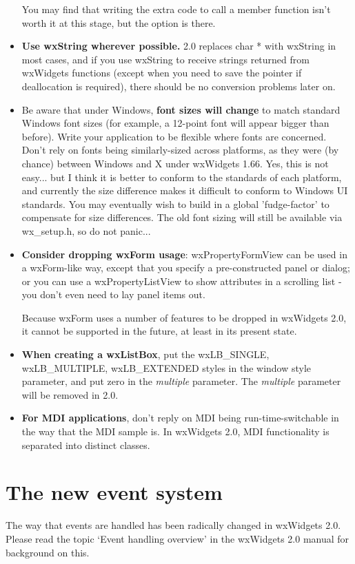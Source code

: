 \begin{itemize}
You may find that writing the extra code to call a member function isn't worth it at this stage,
but the option is there.
\item {\bf Use wxString wherever possible.} 2.0 replaces char * with wxString
in most cases, and if you use wxString to receive strings returned from
wxWidgets functions (except when you need to save the pointer if deallocation is required), there should
be no conversion problems later on.
\item Be aware that under Windows, {\bf font sizes will change} to match standard Windows
font sizes (for example, a 12-point font will appear bigger than before). Write your application
to be flexible where fonts are concerned.
Don't rely on fonts being similarly-sized across platforms, as they were (by chance) between
Windows and X under wxWidgets 1.66. Yes, this is not easy... but I think it is better to conform to the
standards of each platform, and currently the size difference makes it difficult to
conform to Windows UI standards. You may eventually wish to build in a global 'fudge-factor' to compensate
for size differences. The old font sizing will still be available via wx\_setup.h, so do not panic...
\item {\bf Consider dropping wxForm usage}:
wxPropertyFormView can be used in a wxForm-like way, except that you specify a pre-constructed panel
or dialog; or you can use a wxPropertyListView to show attributes in a scrolling list - you don't even need
to lay panel items out.

Because wxForm uses a number of features to be dropped in wxWidgets 2.0, it cannot be
supported in the future, at least in its present state.
\item {\bf When creating a wxListBox}, put the wxLB\_SINGLE, wxLB\_MULTIPLE, wxLB\_EXTENDED styles in the window style parameter, and put
zero in the {\it multiple} parameter. The {\it multiple} parameter will be removed in 2.0.
\item {\bf For MDI applications}, don't reply on MDI being run-time-switchable in the way that the
MDI sample is. In wxWidgets 2.0, MDI functionality is separated into distinct classes.
\end{itemize}

\section{The new event system}\label{portingeventsystem}

The way that events are handled has been radically changed in wxWidgets 2.0. Please
read the topic `Event handling overview' in the wxWidgets 2.0 manual for background
on this.

